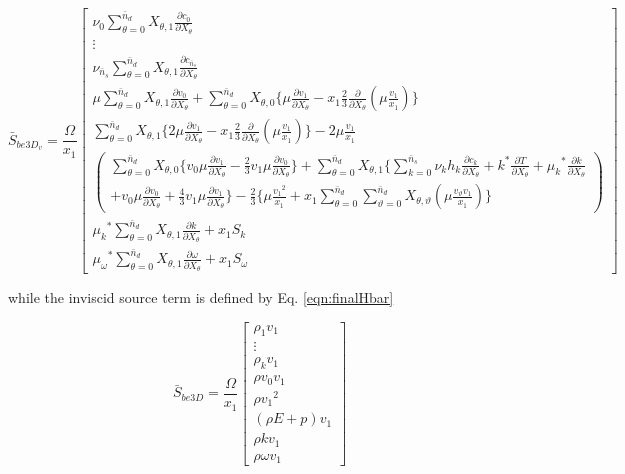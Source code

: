 \begin{equation}
	\bar{S}_{be3D_v} = \frac{\Omega}{x_1}\left[ \begin{array}{c}
		\nu_0 \sum_{\theta = 0}^{\bar{n}_d}X_{\theta,1} 
		\frac{\partial c_0}{\partial X_\theta} \\
		\vdots \\
		\nu_{\bar{n}_s} \sum_{\theta = 0}^{\bar{n}_d}X_{\theta,1} 
		\frac{\partial c_{\bar{n}_s}}{\partial X_\theta} 
		\\
		\mu \sum_{\theta = 0}^{\bar{n}_d} X_{\theta,1}\frac{\partial v_0}{\partial X_\theta}
		+ \sum_{\theta = 0}^{\bar{n}_d} X_{\theta,0} \Big\{\mu \frac{\partial v_1}{\partial X_\theta} 
		- x_1 \frac{2}{3} \frac{\partial}{\partial X_\theta}(\mu \frac{v_1}{x_1}) \Big\} 
		\\
		\sum_{\theta = 0}^{\bar{n}_d}X_{\theta,1}\Big\{2\mu\frac{\partial v_1}{\partial X_\theta} 
		-x_1\frac{2}{3}\frac{\partial}{\partial X_\theta}(\mu\frac{v_1}{x_1})\Big\} - 2\mu\frac{v_1}{x_1} 
		\\
	\left(\begin{array}{c}
		\sum_{\theta = 0}^{\bar{n}_d}X_{\theta,0} \Big\{v_0\mu\frac{\partial v_1}{\partial X_\theta} -\frac{2}{3}
		v_1\mu\frac{\partial v_0}{\partial X_\theta} \Big\} + \sum_{\theta = 0}^{\bar{n}_d}X_{\theta,1}\Big\{
		\sum_{k = 0}^{\bar{n}_s}\nu_k h_k \frac{\partial c_k}{\partial X_\theta} + 
		k^*\frac{\partial T}{\partial X_\theta} + {\mu_k}^*\frac{\partial k}{\partial X_\theta} \\ 
		+ v_0 \mu \frac{\partial v_0}{\partial X_\theta} + \frac{4}{3}v_1 \mu \frac{\partial v_1}{\partial X_\theta}
		\Big\} -\frac{2}{3}\Big\{\mu\frac{{v_1}^2}{x_1} + x_1\sum_{\theta = 0}^{\bar{n}_d}\sum_{\vartheta = 0}^{\bar{n}_d}
		X_{\theta,\vartheta}(\mu\frac{v_\vartheta v_1}{x_1})\Big\}
	\end{array}\right)
		\\	
		{\mu_k}^*\sum_{\theta = 0}^{\bar{n}_d}X_{\theta,1}\frac{\partial k}{\partial X_\theta} + x_1S_k 
		\\
		{\mu_\omega}^*\sum_{\theta = 0}^{\bar{n}_d}X_{\theta,1}\frac{\partial \omega}{\partial X_\theta} + x_1S_\omega
		   \end{array}
	    \right]
\label{finalHvbar}
\end{equation} 

	while the inviscid source term is defined by Eq. \ref{eqn:finalHbar}

\begin{displaymath}
	\bar{S}_{be3D} = \frac{\Omega}{x_1}\left[ \begin{array}{c}
		\rho_1 v_1 \\
		\vdots \\
		\rho_k v_1 \\
		\rho v_0v_1 \\
		\rho {v_1}^2 \\
		(\rho E + p)v_1 \\
		\rho k v_1 \\
		\rho \omega v_1
		   \end{array}
	    \right]
\end{displaymath}